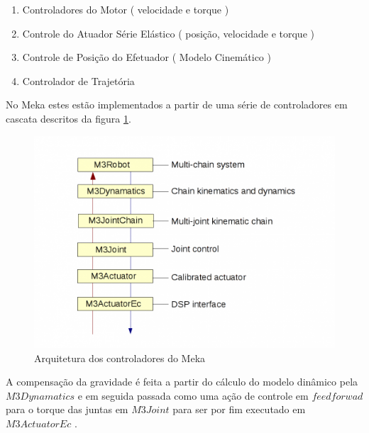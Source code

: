 \begin{enumerate}
    \item Controladores do Motor ( velocidade e torque )
    \item Controle do Atuador Série Elástico ( posição, velocidade e torque )
    \item Controle de Posição do Efetuador ( Modelo Cinemático )
    \item Controlador de Trajetória
\end{enumerate}

No Meka estes estão implementados a partir de uma série de controladores em cascata descritos da figura \ref{fig:controlarch}.

\begin{figure}[H]
    \centering
    \includegraphics[width=0.7\linewidth]{tex/figs/controlarch.png}
    \caption{Arquitetura dos controladores do Meka \cite{mekaguide}}
    \label{fig:controlarch}
\end{figure}

A compensação da gravidade é feita a partir do cálculo do modelo dinâmico pela $M3Dynamatics$ e em seguida passada como uma ação de controle em $feedforwad$ para o torque das juntas em $M3Joint$ para ser por fim executado em $M3ActuatorEc$ \cite{mekaguide}.




